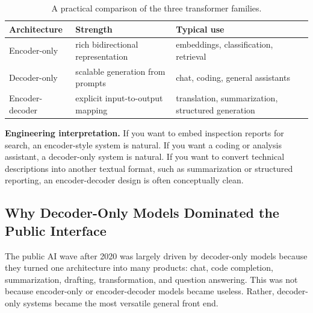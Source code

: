 \documentclass[12pt]{article}
\begin{document}
\begin{table}[ht]
    \centering
    \caption{A practical comparison of the three transformer families.}
    \label{t16tab:architectures}
    \begin{tabulary}{\textwidth}{L L L}
        \toprule
        \textbf{Architecture} & \textbf{Strength} & \textbf{Typical use} \\
        \midrule
        Encoder-only & rich bidirectional representation & embeddings, classification, retrieval \\
        Decoder-only & scalable generation from prompts & chat, coding, general assistants \\
        Encoder-decoder & explicit input-to-output mapping & translation, summarization, structured generation \\
        \bottomrule
    \end{tabulary}
\end{table}

\begin{ex-box}
\textbf{Engineering interpretation.} If you want to embed inspection reports for search, an encoder-style system is natural. If you want a coding or analysis assistant, a decoder-only system is natural. If you want to convert technical descriptions into another textual format, such as summarization or structured reporting, an encoder-decoder design is often conceptually clean.
\end{ex-box}

\subsection{Why Decoder-Only Models Dominated the Public Interface}

The public AI wave after 2020 was largely driven by decoder-only models because they turned one architecture into many products: chat, code completion, summarization, drafting, transformation, and question answering. This was not because encoder-only or encoder-decoder models became useless. Rather, decoder-only systems became the most versatile general front end.
\end{document}

